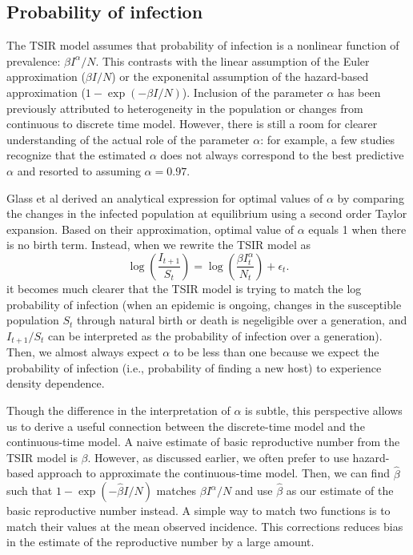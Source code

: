 \documentclass{article}
\begin{document}
\subsection{Probability of infection}

The TSIR model assumes that probability of infection is a nonlinear function of prevalence: $\beta I^\alpha/N$.
This contrasts with the linear assumption of the Euler approximation ($\beta I/N$) or the exponenital assumption of the hazard-based approximation ($1 - \exp(- \beta I/N)$).
Inclusion of the parameter $\alpha$ has been previously attributed to heterogeneity in the population or changes from continuous to discrete time model.
However, there is still a room for clearer understanding of the actual role of the parameter $\alpha$:
for example, a few studies recognize that the estimated $\alpha$ does not always correspond to the best predictive $\alpha$ and resorted to assuming $\alpha = 0.97$.

Glass et al derived an analytical expression for optimal values of $\alpha$ by comparing the changes in the infected population at equilibrium using a second order Taylor expansion. 
Based on their approximation, optimal value of $\alpha$ equals 1 when there is no birth term.
Instead, when we rewrite the TSIR model as 
\begin{equation}
\log \left(\frac{I_{t+1}}{S_t}\right) = \log\left(\frac{\beta I_t^\alpha}{N_t}\right) + \epsilon_t.
\end{equation}
it becomes much clearer that the TSIR model is trying to match the log probability of infection (when an epidemic is ongoing, changes in the susceptible population $S_t$ through natural birth or death is negeligible over a generation, and $I_{t+1}/S_t$ can be interpreted as the probability of infection over a generation). 
Then, we almost always expect $\alpha$ to be less than one because we expect the probability of infection (i.e., probability of finding a new host) to experience density dependence.

Though the difference in the interpretation of $\alpha$ is subtle, this perspective allows us to derive a useful connection between the discrete-time model and the continuous-time model.
A naive estimate of basic reproductive number from the TSIR model is $\beta$.
However, as discussed earlier, we often prefer to use hazard-based approach to approximate the continuous-time model. 
Then, we can find $\hat \beta$ such that $1 - \exp(-\hat\beta I/N)$ matches $\beta I^\alpha/N$ and use $\hat \beta$ as our estimate of the basic reproductive number instead.
A simple way to match two functions is to match their values at the mean observed incidence.
This corrections reduces bias in the estimate of the reproductive number by a large amount.
\end{document}
